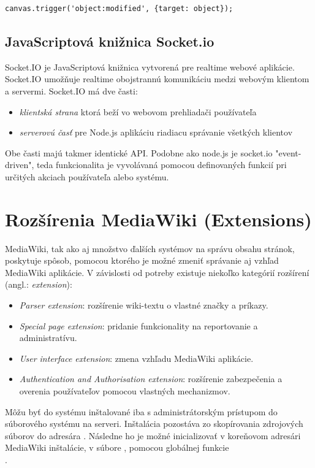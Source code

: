 \begin{lstlisting}[style=web,caption={Manuálne vyvolanie udalosti v knižnici FabricJS},captionpos=b, label={lst:fabric-trigger}]
canvas.trigger('object:modified', {target: object});
\end{lstlisting}


\subsection{JavaScriptová knižnica Socket.io}
Socket.IO je JavaScriptová knižnica vytvorená pre realtime webové aplikácie. Socket.IO umožňuje realtime obojstrannú komunikáciu medzi webovým klientom a servermi. Socket.IO má dve časti:
\begin{itemize}
	\item \textit{klientská strana} ktorá beží vo webovom prehliadači používateľa
	\item \textit{serverovú časť} pre Node.js aplikáciu riadiacu správanie všetkých klientov
\end{itemize}
Obe časti majú takmer identické API. Podobne ako node.js je socket.io "event-driven", teda funkcionalita je vyvolávaná pomocou definovaných funkcií pri určitých akciach používateľa alebo systému.



\section{Rozšírenia MediaWiki (Extensions)}
MediaWiki, tak ako aj množstvo ďalších systémov na správu obsahu stránok, poskytuje spôsob, pomocou ktorého je možné zmeniť správanie aj vzhľad MediaWiki aplikácie. V závislosti od potreby existuje niekoľko kategórií rozšírení (angl.: \textit{extension}):
\begin{itemize}
	\item \textit{Parser extension}: rozšírenie wiki-textu o vlastné značky a príkazy.
	\item \textit{Special page extension}: pridanie funkcionality na reportovanie a administratívu.
	\item \textit{User interface extension}: zmena vzhľadu MediaWiki aplikácie.
	\item \textit{Authentication and Authorisation extension}: rozšírenie zabezpečenia a overenia používateľov pomocou vlastných mechanizmov.
\end{itemize} 

Môžu byť do systému inštalované iba s administrátorským prístupom do súborového systému na serveri. Inštalácia pozostáva zo skopírovania zdrojových súborov do adresára . Následne ho je možné inicializovať v koreňovom adresári MediaWiki inštalácie, v súbore , pomocou globálnej funkcie\\
.

